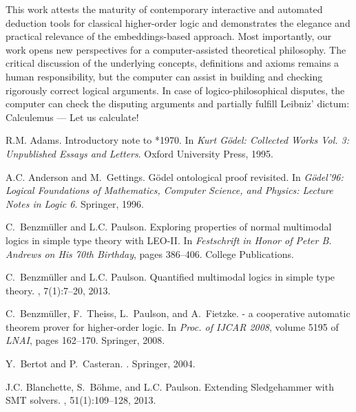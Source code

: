 \documentclass{llncs}
\begin{document}
This work attests the maturity of contemporary interactive and
automated deduction tools for classical higher-order logic and
demonstrates the elegance and practical relevance of the
embeddings-based approach.  Most importantly, our work opens new
perspectives for a computer-assisted theoretical philosophy.  The
critical discussion of the underlying concepts, definitions and axioms
remains a human responsibility, but the computer can assist in
building and checking rigorously correct logical arguments. In case of
logico-philosophical disputes, the computer can check the disputing
arguments and partially fulfill Leibniz' dictum: Calculemus --- Let us
calculate!


%
\begin{thebibliography}{10}

R.M. Adams.
\newblock Introductory note to *1970.
\newblock In {\em {Kurt G\"odel: Collected Works Vol. 3: Unpublished Essays and
  Letters}}. Oxford University Press, 1995.

A.C. Anderson and M.~Gettings.
\newblock G\"odel ontological proof revisited.
\newblock In {\em {G\"odel'96: Logical Foundations of Mathematics, Computer
  Science, and Physics: Lecture Notes in Logic 6}}. {Springer}, 1996.

C.~Benzm{\"u}ller and L.C. Paulson.
\newblock Exploring properties of normal multimodal logics in simple type
  theory with {LEO-II}.
\newblock In {\em {Festschrift in Honor of {Peter B. Andrews} on His 70th
  Birthday}}, pages 386--406. College Publications.

C.~Benzm{\"u}ller and L.C. Paulson.
\newblock Quantified multimodal logics in simple type theory.
,
  7(1):7--20, 2013.

C.~Benzm{\"u}ller, F.~Theiss, L.~Paulson, and A.~Fietzke.
 - a cooperative automatic theorem prover for higher-order
  logic.
\newblock In {\em Proc. of IJCAR 2008}, volume 5195 of {\em LNAI}, pages
  162--170. Springer, 2008.

Y.~Bertot and P.~Casteran.
.
\newblock Springer, 2004.

J.C. Blanchette, S.~B\"ohme, and L.C. Paulson.
\newblock Extending {Sledgehammer} with {SMT} solvers.
, 51(1):109--128, 2013.


\end{thebibliography}
\end{document}
